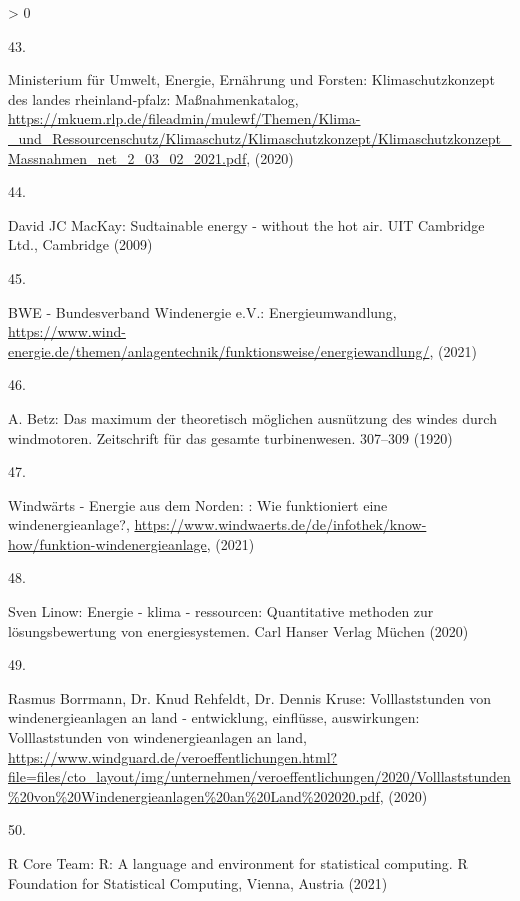 \documentclass[a4paper,11pt]{article}
\newlength{\cslhangindent}
\newlength{\csllabelwidth}
\newenvironment{CSLReferences}[3] %
 {%
  \setlength{\parindent}{0pt}
  \ifodd #1 \everypar{\setlength{\hangindent}{\cslhangindent}}\ignorespaces\fi
  \ifnum #2 > 0
  \setlength{\parskip}{#2\baselineskip}
  \fi
 }%
 {}
\newcommand{\CSLLeftMargin}[1]{\parbox[t]{\maxof{\widthof{#1}}{\csllabelwidth}}{#1}}
\newcommand{\CSLRightInline}[1]{\parbox[t]{\linewidth}{#1}}
\begin{document}
\begin{CSLReferences}{0}{0}
\leavevmode\hypertarget{ref-MinisteriumfurUmweltEnergieErnahrungundForsten.2020}{}%
\CSLLeftMargin{43. }
\CSLRightInline{Ministerium für Umwelt, Energie, Ernährung und Forsten: Klimaschutzkonzept des landes rheinland-pfalz: Ma{ß}nahmenkatalog, \url{https://mkuem.rlp.de/fileadmin/mulewf/Themen/Klima-_und_Ressourcenschutz/Klimaschutz/Klimaschutzkonzept/Klimaschutzkonzept_Massnahmen_net_2_03_02_2021.pdf}, (2020)}

\leavevmode\hypertarget{ref-DavidJCMacKay.2009}{}%
\CSLLeftMargin{44. }
\CSLRightInline{David JC MacKay: Sudtainable energy - without the hot air. {UIT Cambridge Ltd.}, Cambridge (2009)}

\leavevmode\hypertarget{ref-BWE.2021}{}%
\CSLLeftMargin{45. }
\CSLRightInline{BWE - Bundesverband Windenergie e.V.: Energieumwandlung, \url{https://www.wind-energie.de/themen/anlagentechnik/funktionsweise/energiewandlung/}, (2021)}

\leavevmode\hypertarget{ref-A.Betz.1920}{}%
\CSLLeftMargin{46. }
\CSLRightInline{A. Betz: Das maximum der theoretisch m{ö}glichen ausn{ü}tzung des windes durch windmotoren. Zeitschrift f{ü}r das gesamte turbinenwesen. 307--309 (1920)}

\leavevmode\hypertarget{ref-WindwartsEnergieausdemNorden.2021}{}%
\CSLLeftMargin{47. }
\CSLRightInline{Windwärts - Energie aus dem Norden: : Wie funktioniert eine windenergieanlage?, \url{https://www.windwaerts.de/de/infothek/know-how/funktion-windenergieanlage}, (2021)}

\leavevmode\hypertarget{ref-SvenLinow.2020}{}%
\CSLLeftMargin{48. }
\CSLRightInline{Sven Linow: Energie - klima - ressourcen: Quantitative methoden zur l{ö}sungsbewertung von energiesystemen. {Carl Hanser Verlag M{ü}chen} (2020)}

\leavevmode\hypertarget{ref-RasmusBorrmannDr.KnudRehfeldtDr.DennisKruse.2020}{}%
\CSLLeftMargin{49. }
\CSLRightInline{Rasmus Borrmann, Dr. Knud Rehfeldt, Dr. Dennis Kruse: Volllaststunden von windenergieanlagen an land - entwicklung, einfl{ü}sse, auswirkungen: Volllaststunden von windenergieanlagen an land, \url{https://www.windguard.de/veroeffentlichungen.html?file=files/cto_layout/img/unternehmen/veroeffentlichungen/2020/Volllaststunden\%20von\%20Windenergieanlagen\%20an\%20Land\%202020.pdf}, (2020)}

\leavevmode\hypertarget{ref-R}{}%
\CSLLeftMargin{50. }
\CSLRightInline{R Core Team: R: A language and environment for statistical computing. R Foundation for Statistical Computing, Vienna, Austria (2021)}


\end{CSLReferences}
\end{document}

